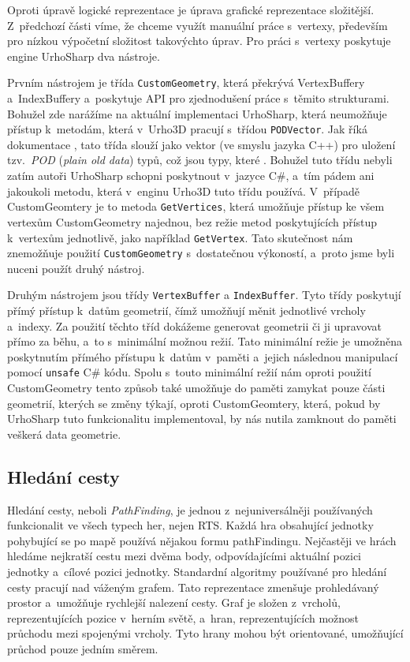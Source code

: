 Oproti úpravě logické reprezentace je úprava grafické reprezentace složitější. Z~předchozí části víme, že chceme využít manuální práce s~vertexy, především pro nízkou výpočetní složitost takovýchto úprav. Pro práci s~vertexy poskytuje engine UrhoSharp dva nástroje. 

Prvním nástrojem je třída \texttt{CustomGeometry}, která překrývá VertexBuffery a~IndexBuffery a~poskytuje API pro zjednodušení práce s~těmito strukturami. Bohužel zde narážíme na aktuální implementaci UrhoSharp, která neumožňuje přístup k~metodám, která v~Urho3D pracují s~třídou \texttt{PODVector}. Jak říká dokumentace \citep{site:urho3DPOD}, tato třída slouží jako vektor (ve smyslu jazyka C++) pro uložení tzv.~\textit{POD} (\textit{plain old data}) typů, což jsou typy, které \textit{}. Bohužel tuto třídu nebyli zatím autoři UrhoSharp schopni poskytnout v~jazyce C\#, a~tím pádem ani jakoukoli metodu, která v~enginu Urho3D tuto třídu používá. V~případě CustomGeomtery je to metoda \texttt{GetVertices}, která umožňuje přístup ke všem vertexům CustomGeometry najednou, bez režie metod poskytujících přístup k~vertexům jednotlivě, jako například \texttt{GetVertex}. Tato skutečnost nám znemožňuje použití \texttt{CustomGeometry} s~dostatečnou výkoností, a~proto jsme byli nuceni použít druhý nástroj.

Druhým nástrojem jsou třídy \texttt{VertexBuffer} a \texttt{IndexBuffer}. Tyto třídy poskytují přímý přístup k~datům geometrií, čímž umožňují měnit jednotlivé vrcholy a~indexy. Za použití těchto tříd dokážeme generovat geometrii či ji upravovat přímo za běhu, a~to s~minimální možnou režií. Tato minimální režie je umožněna poskytnutím přímého přístupu k~datům v~paměti a~jejich následnou manipulací pomocí \texttt{unsafe} C\# kódu. Spolu s~touto minimální režií nám oproti použití CustomGeometry tento způsob také umožňuje do paměti zamykat pouze části geometrií, kterých se změny týkají, oproti CustomGeomtery, která, pokud by UrhoSharp tuto funkcionalitu implementoval, by nás nutila zamknout do paměti veškerá data geometrie.


\subsection{Hledání cesty}
\label{sec:pathfinding}
Hledání cesty, neboli \textit{PathFinding}, je jednou z~nejuniversálněji používaných funkcionalit ve všech typech her, nejen RTS. Každá hra obsahující jednotky pohybující se po mapě používá nějakou formu pathFindingu. Nejčastěji ve hrách hledáme nejkratší cestu mezi dvěma body, odpovídajícími aktuální pozici jednotky a~cílové pozici jednotky. Standardní algoritmy používané pro hledání cesty pracují nad váženým grafem. Tato reprezentace zmenšuje prohledávaný prostor a~umožňuje rychlejší nalezení cesty. Graf je složen z~vrcholů, reprezentujících pozice v~herním světě, a~hran, reprezentujících možnost průchodu mezi spojenými vrcholy. Tyto hrany mohou být orientované, umožňující průchod pouze jedním směrem.

